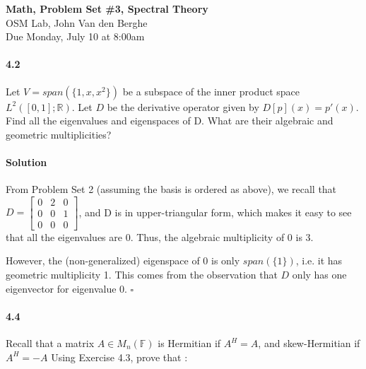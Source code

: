 \documentclass[letterpaper,12pt]{article}
\theoremstyle{definition}
\begin{document}
\begin{flushleft}
   \textbf{\large{Math, Problem Set \#3, Spectral Theory}} \\[5pt]
   OSM Lab, John Van den Berghe\\[5pt]
   Due Monday, July 10 at 8:00am
\end{flushleft}

\vspace{5mm}
   

\paragraph{4.2} Let $V = span(\{1, x, x^2\})$ be a subspace of the inner product space $L^2([0, 1]; \mathbb{R})$. Let $D$ be the derivative operator given by $D[p](x) = p'(x)$. Find all the eigenvalues and eigenspaces of D. What are their algebraic and geometric multiplicities?

\paragraph{Solution} From Problem Set 2 (assuming the basis is ordered as above), we recall that $D = \begin{bmatrix}
0 & 2 & 0 \\
0 & 0 & 1 \\
0 & 0 & 0
\end{bmatrix}$, and D is in upper-triangular form, which makes it easy to see that all the eigenvalues are 0. Thus, the algebraic multiplicity of 0 is 3. 

However, the (non-generalized) eigenspace of 0 is only $span(\{1\})$, i.e. it has geometric multiplicity 1. This comes from the observation that $D$ only has one eigenvector for eigenvalue 0. $\square$
   
   
\paragraph{4.4} Recall that a matrix $A \in M_n(\mathbb{F})$ is Hermitian if $A^H = A$, and skew-Hermitian if $A^H =  - A$ Using Exercise 4.3, prove that :
\end{document}
